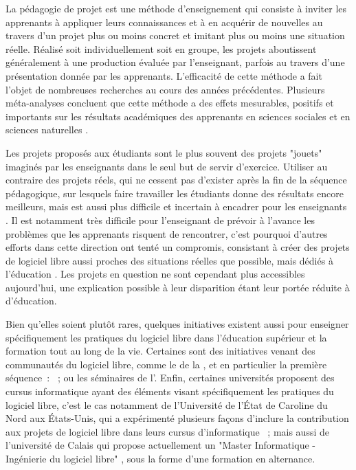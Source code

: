 La pédagogie de projet est une méthode d'enseignement qui consiste à inviter les apprenants à appliquer leurs
connaissances et à en acquérir de nouvelles au travers d'un projet plus ou moins concret et imitant plus ou
moins une situation réelle. Réalisé soit individuellement soit en groupe, les projets aboutissent généralement
à une production évaluée par l'enseignant, parfois au travers d'une présentation donnée par les apprenants.
L'efficacité de cette méthode a fait l'objet de nombreuses recherches au cours des années précédentes.
Plusieurs méta-analyses concluent que cette méthode a des effets mesurables, positifs et importants sur les
résultats académiques des apprenants en sciences sociales et en sciences naturelles
.

Les projets proposés aux étudiants sont le plus souvent des projets "jouets" imaginés par les enseignants dans
le seul but de servir d'exercice. Utiliser au contraire des projets réels, qui ne cessent pas d'exister après
la fin de la séquence pédagogique, sur lesquels faire travailler les étudiants donne des résultats encore
meilleurs, mais est aussi plus difficile et incertain à encadrer pour les enseignants
. Il est notamment très difficile pour l'enseignant de prévoir à
l'avance les problèmes que les apprenants risquent de rencontrer, c'est pourquoi d'autres efforts dans cette
direction ont tenté un compromis, consistant à créer des projets de logiciel libre aussi proches des
situations réelles que possible, mais dédiés à l'éducation . Les projets en
question ne sont cependant plus accessibles aujourd'hui, une explication possible à leur disparition étant
leur portée réduite à d'éducation.

Bien qu'elles soient plutôt rares, quelques initiatives existent aussi pour enseigner spécifiquement les
pratiques du logiciel libre dans l'éducation supérieur et la formation tout au long de la vie. Certaines sont
des initiatives venant des communautés du logiciel libre, comme le %
de la , et en particulier la première séquence : %
 ; ou les
séminaires de l'.
Enfin, certaines universités proposent des cursus informatique ayant des éléments visant spécifiquement les
pratiques du logiciel libre, c'est le cas notamment de l'Université de l'État de Caroline du Nord aux
États-Unis, qui a expérimenté plusieurs façons d'inclure la contribution aux projets de logiciel libre dans
leurs cursus d'informatique  ; mais aussi de l'université de Calais
qui propose actuellement un "Master Informatique - Ingénierie du logiciel libre"%
,
sous la forme d'une formation en alternance.
